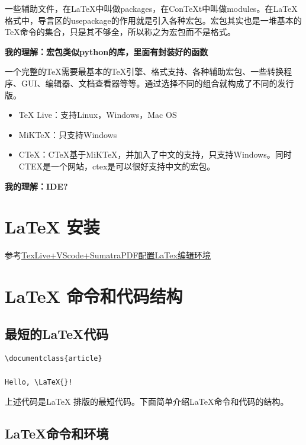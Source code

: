 \begin{explain*}[宏包]
    一些辅助文件，在LaTeX中叫做packages，在ConTeXt中叫做modules。在LaTeX格式中，导言区的usepackage的作用就是引入各种宏包。宏包其实也是一堆基本的TeX命令的集合，只是其不够全，所以称之为宏包而不是格式。

    \bf{我的理解：宏包类似python的库，里面有封装好的函数}
\end{explain*}

\begin{explain*}[发行版]
    一个完整的TeX需要最基本的TeX引擎、格式支持、各种辅助宏包、一些转换程序、GUI、编辑器、文档查看器等等。通过选择不同的组合就构成了不同的发行版。
    \begin{itemize}
        \item TeX Live：支持Linux，Windows，Mac OS
        \item MiKTeX：只支持Windows
        \item CTeX：CTeX基于MiKTeX，并加入了中文的支持，只支持Windows。同时CTEX是一个网站，ctex是可以很好支持中文的宏包。
    \end{itemize}

    \bf{我的理解：IDE?}
\end{explain*}

\section{\LaTeX{} 安装}\label{sec:latexinstall}
参考\href{https://summersong.top/post/1f879cd9.html}{TexLive+VScode+SumatraPDF配置LaTex编辑环境}

\section{\LaTeX{} 命令和代码结构}\label{sec:latexstructure}
\subsection{最短的\LaTeX{}代码}\label{subsec:shortlatexcode}
\begin{lstlisting}
\documentclass{article}

Hello, \LaTeX{}!

\end{lstlisting}

上述代码是\LaTeX{} 排版的最短代码。下面简单介绍\LaTeX{}命令和代码的结构。

\subsection{\LaTeX{}命令和环境}\label{subsec:latexcommands}

